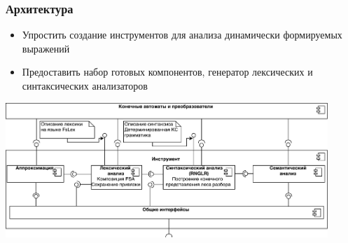 \documentclass{beamer}
\begin{document}
%

\begin{frame}
    \transwipe[direction=90]
    \frametitle{Архитектура}
    \begin{itemize}
        \item Упростить создание инструментов для анализа динамически формируемых выражений
        \item Предоставить набор готовых компонентов, генератор лексических и синтаксических анализаторов
    \end{itemize}

    \includegraphics[width=345pt]{pictures/Components.pdf}
\end{frame}
\end{document}

